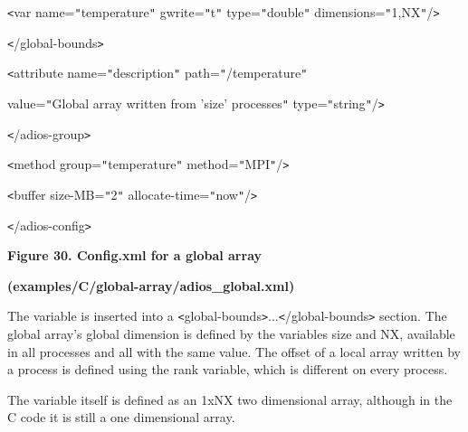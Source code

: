 \vspace{10pt}
\parindent=7pt
{\color{color02} \texttt{<}var name=\texttt{"}temperature\texttt{"} gwrite=\texttt{"}t\texttt{"} 
type=\texttt{"}double\texttt{"} dimensions=\texttt{"}1,NX\texttt{"}/\texttt{>}}

\vspace{10pt}
\parindent=0pt
{\color{color02} \texttt{<}/global-bounds\texttt{>}}

\vspace{10pt}
\parindent=28pt
\texttt{<}attribute name=\texttt{"}description\texttt{"} path=\texttt{"}/temperature\texttt{"}

\vspace{10pt}
\parindent=72pt
value=\texttt{"}Global array written from 'size' processes\texttt{"} type=\texttt{"}string\texttt{"}/\texttt{>}

\vspace{10pt}
\parindent=14pt
\texttt{<}/adios-group\texttt{>}

\vspace{22pt}
\parindent=0pt
\texttt{<}method group=\texttt{"}temperature\texttt{"} method=\texttt{"}MPI\texttt{"}/\texttt{>}

\vspace{10pt}
\texttt{<}buffer size-MB=\texttt{"}2\texttt{"} allocate-time=\texttt{"}now\texttt{"}/\texttt{>}

\vspace{22pt}
\texttt{<}/adios-config\texttt{>} 

\label{HRef119581446}\label{HToc144350189}

\vspace{22pt}
\begin{center}
{\color{color20} \textbf{Figure 30. Config.xml for a global array }}

\vspace{10pt}
{\color{color20} \textbf{(examples/C/global-array/adios\_global.xml)\label{HToc212017568}\label{HToc212017704}}}
\end{center}

\vspace{10pt}
The variable is inserted into a \texttt{<}global-bounds\texttt{>}...\texttt{<}/global-bounds\texttt{>} 
section. The global array's global dimension is defined by the variables size and 
NX, available in all processes and all with the same value. The offset of a local 
array written by a process is defined using the rank variable, which is different 
on every process.

\vspace{10pt}
The variable itself is defined as an 1xNX two dimensional array, although in the 
C code it is still a one dimensional array. 

